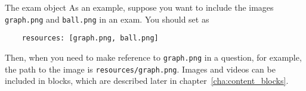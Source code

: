 \begin{chapter}{\label{cha:exam_object}The exam object}
  As an example, suppose you want to include the images \verb"graph.png" and
  \verb"ball.png" in an exam.  You should set  as
  \begin{Verbatim}
    resources: [graph.png, ball.png]
  \end{Verbatim}
  Then, when you need to make reference to \verb"graph.png" in a question, for
  example, the path to the image is \verb"resources/graph.png".  Images and
  videos can be included in  blocks, which are described
  later in chapter~\ref{cha:content_blocks}.

\end{chapter}
